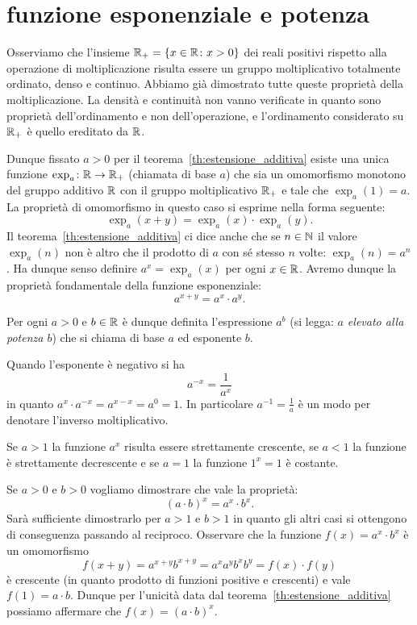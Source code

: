 \section{funzione esponenziale e potenza}
\label{sec:esponenziale}

Osserviamo che l'insieme ${\mathbb R}_+ = {\left\{ x\in {\mathbb R}\colon x>0 \right\}}$ 
dei reali positivi rispetto alla operazione di moltiplicazione 
risulta essere un gruppo moltiplicativo totalmente ordinato, 
denso e continuo. 
Abbiamo già dimostrato tutte queste proprietà della moltiplicazione.
La densità e continuità non vanno verificate in quanto sono proprietà 
dell'ordinamento e non dell'operazione, e l'ordinamento considerato 
su ${\mathbb R}_+$ è quello ereditato da ${\mathbb R}$.

Dunque fissato $a>0$ per il teorema~\ref{th:estensione_additiva}
esiste una unica funzione $\exp_a\colon {\mathbb R} \to {\mathbb R}_+$ 
(chiamata  di base $a$)
che sia un omomorfismo monotono del gruppo additivo ${\mathbb R}$ con il gruppo
moltiplicativo ${\mathbb R}_+$ e tale che $\exp_a(1)=a$.
La proprietà di omomorfismo in questo caso 
si esprime nella forma seguente: 
\begin{equation}\label{eq:3589673}
  \exp_a(x+y) = \exp_a(x)\cdot \exp_a(y).
\end{equation}
Il teorema~\ref{th:estensione_additiva}
ci dice anche che se $n\in {\mathbb N}$ il valore $\exp_a(n)$ 
non è altro che il prodotto di $a$ 
con sé stesso $n$ volte: $\exp_a(n) = a^n$. 
Ha dunque senso definire 
$a^x = \exp_a(x)$ per ogni $x\in {\mathbb R}$.
Avremo dunque la proprietà fondamentale della funzione 
esponenziale:
\[
  a^{x+y} = a^x\cdot a^y.
\]

Per ogni $a>0$ e $b\in {\mathbb R}$ è dunque definita l'espressione $a^b$
(si legga: \emph{$a$ elevato alla potenza $b$}) che si chiama 
 di base $a$ ed esponente $b$.

Quando l'esponente è negativo si ha 
\[
  a^{-x} = \frac{1}{a^x}  
\]
in quanto $a^x\cdot a^{-x} = a^{x-x} = a^0 = 1$.
In particolare $a^{-1} = \frac{1}{a}$ è un modo per denotare  
l'inverso moltiplicativo.

Se $a>1$ 
la funzione $a^x$ risulta essere strettamente crescente, 
se $a<1$ la funzione è strettamente decrescente 
e se $a=1$ la funzione $1^x=1$ è costante.

Se $a>0$ e $b>0$ vogliamo dimostrare che vale la proprietà:
\[
  (a\cdot b)^x = a^x\cdot b^x.
\]
Sarà sufficiente dimostrarlo per $a>1$ e $b>1$ in quanto gli 
altri casi si ottengono di conseguenza passando al reciproco.
Osservare che la funzione $f(x)=a^x\cdot b^x$ 
è un omomorfismo
\[
f(x+y) = a^{x+y}b^{x+y} = a^x a^y b^x b^y =  f(x)\cdot f(y)
\]
è crescente (in quanto prodotto di funzioni positive e crescenti)
e vale $f(1) = a\cdot b$. 
Dunque per l'unicità data dal teorema~\ref{th:estensione_additiva}
possiamo affermare che $f(x)=(a\cdot b)^x$.

